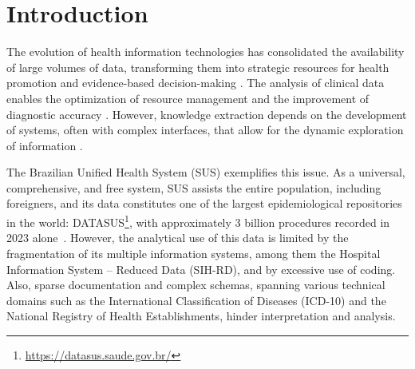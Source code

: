 \documentclass[conference]{IEEEtran}
\begin{document}




%
\IEEEpeerreviewmaketitle


\section{Introduction}


The evolution of health information technologies has consolidated the availability of large volumes of data, transforming them into strategic resources for health promotion and evidence-based decision-making \cite{Raghupathi2014}. The analysis of clinical data enables the optimization of resource management and the improvement of diagnostic accuracy \cite{Alhejaily2025}. However, knowledge extraction depends on the development of systems, often with complex interfaces, that allow for the dynamic exploration of information \cite{Dash2019}.

The Brazilian Unified Health System (SUS) exemplifies this issue. As a universal, comprehensive, and free system, SUS assists the entire population, including foreigners, and its data constitutes one of the largest epidemiological repositories in the world: DATASUS\footnote{\url{https://datasus.saude.gov.br/}}, with approximately 3 billion procedures recorded in 2023 alone~\cite{Brasil2024}. However, the analytical use of this data is limited by the fragmentation of its multiple information systems, among them the Hospital Information System – Reduced Data (SIH-RD), and by excessive use of coding. Also, sparse documentation and complex schemas, spanning various technical domains such as the International Classification of Diseases (ICD-10) and the National Registry of Health Establishments, hinder interpretation and analysis.
\end{document}

